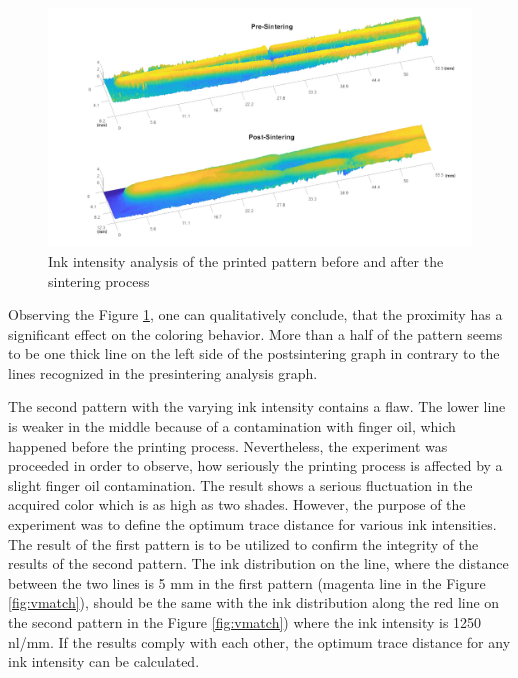 \begin{figure}[H]
	\centering
	\includegraphics[width=1\textwidth]{grafiken/prepostV.jpg}
	\caption{Ink intensity analysis of the printed pattern before and after the sintering process}
	\label{fig:prepostV}
\end{figure} 

\bigskip

Observing the Figure \ref{fig:prepostV}, one can qualitatively conclude, that the proximity has a significant effect on the coloring behavior. More than a half of the pattern seems to be one thick line on the left side of the postsintering graph in contrary to the lines recognized in the presintering analysis graph. 

The second pattern with the varying ink intensity contains a flaw. The lower line is weaker in the middle because of a contamination with finger oil, which happened before the printing process. Nevertheless, the experiment was proceeded in order to observe, how seriously the printing process is affected by a slight finger oil contamination. The result shows a serious fluctuation in the acquired color which is as high as two shades. However, the purpose of the experiment was to define the optimum trace distance for various ink intensities. The result of the first pattern is to be utilized to confirm the integrity of the results of the second pattern. The ink distribution on the line, where the distance between the two lines is 5 mm in the first pattern (magenta line in the Figure \ref{fig:vmatch}), should be the same with the ink distribution along the red line on the second pattern in the Figure \ref{fig:vmatch}) where the ink intensity is 1250 nl/mm. If the results comply with each other, the optimum trace distance for any ink intensity can be calculated.

\bigskip

